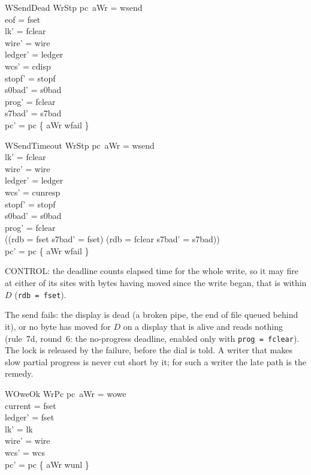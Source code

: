 \documentclass[a4paper,10pt,fleqn]{article}
\begin{document}
\begin{schema}{WSendDead}
  WrStp
\where
  pc~aWr = wsend \\
  eof = fset \\
  lk' = fclear \\
  wire' = wire \\
  ledger' = ledger \\
  wcs' = cdisp \\
  stopf' = stopf \\
  s0bad' = s0bad \\
  prog' = fclear \\
  s7bad' = s7bad \\
  pc' = pc \oplus \{ aWr \mapsto wfail \}
\end{schema}

\begin{schema}{WSendTimeout}
  WrStp
\where
  pc~aWr = wsend \\
  lk' = fclear \\
  wire' = wire \\
  ledger' = ledger \\
  wcs' = cunresp \\
  stopf' = stopf \\
  s0bad' = s0bad \\
  prog' = fclear \\
  ((rdb = fset \land s7bad' = fset) \lor (rdb = fclear \land s7bad' = s7bad)) \\
  pc' = pc \oplus \{ aWr \mapsto wfail \}
\end{schema}

CONTROL: the deadline counts elapsed time for the whole write, so it may fire at
either of its sites with bytes having moved since the write began, that is
within $D$ (\texttt{rdb = fset}).

The send fails: the display is dead (a broken pipe, the end of file queued
behind it), or no byte has moved for $D$ on a display that is alive and reads
nothing (rule~7d, round~6: the no-progress deadline, enabled only with
\texttt{prog = fclear}).  The lock is released by the failure, before the dial
is told.  A writer that makes slow partial progress is never cut short by it;
for such a writer the late path is the remedy.

\begin{schema}{WOweOk}
  WrPc
\where
  pc~aWr = wowe \\
  current = fset \\
  ledger' = fset \\
  lk' = lk \\
  wire' = wire \\
  wcs' = wcs \\
  pc' = pc \oplus \{ aWr \mapsto wunl \}
\end{schema}
\end{document}

